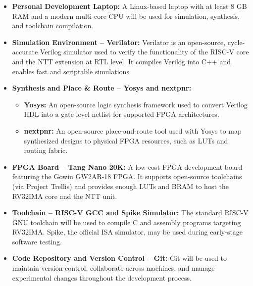 \documentclass[a4paper, 12pt, titlepage]{article}
\begin{document}
\begin{itemize}
  \item \textbf{Personal Development Laptop:} A Linux-based laptop with at least 8 GB RAM and a modern multi-core CPU will be used for simulation, synthesis, and toolchain compilation.
  
  \item \textbf{Simulation Environment – Verilator:}  
  Verilator is an open-source, cycle-accurate Verilog simulator used to verify the functionality of the RISC-V core and the NTT extension at RTL level. It compiles Verilog into C++ and enables fast and scriptable simulations.  
  
  \item \textbf{Synthesis and Place \& Route – Yosys and nextpnr:}  
  \begin{itemize}
    \item \textbf{Yosys:} An open-source logic synthesis framework used to convert Verilog HDL into a gate-level netlist for supported FPGA architectures.  
    \item \textbf{nextpnr:} An open-source place-and-route tool used with Yosys to map synthesized designs to physical FPGA resources, such as LUTs and routing fabric.  
  \end{itemize}
  
  \item \textbf{FPGA Board – Tang Nano 20K:}  
  A low-cost FPGA development board featuring the Gowin GW2AR-18 FPGA. It supports open-source toolchains (via Project Trellis) and provides enough LUTs and BRAM to host the RV32IMA core and the NTT unit.  
  
  \item \textbf{Toolchain – RISC-V GCC and Spike Simulator:}  
  The standard RISC-V GNU toolchain will be used to compile C and assembly programs targeting RV32IMA. Spike, the official ISA simulator, may be used during early-stage software testing.  
  
  \item \textbf{Code Repository and Version Control – Git:}  
  Git will be used to maintain version control, collaborate across machines, and manage experimental changes throughout the development process.
  
\end{itemize}
\end{document}
